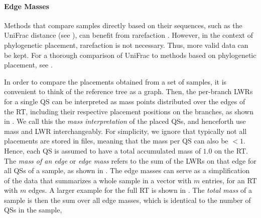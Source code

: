 \paragraph{Edge Masses}
\label{ch:Foundations:sec:PhylogeneticPlacement:sub:PlacementProcessing:par:EdgeMasses}

Methods that compare samples directly based on their sequences,
such as the UniFrac distance \cite{Lozupone2005,Lozupone2007a}
(see ),
can benefit from rarefaction \cite{Weiss2017}.
However, in the context of phylogenetic placement, rarefaction is not necessary.
Thus, more valid data can be kept.
For a thorough comparison of UniFrac to methods based on phylogenetic placement, see \cite{Matsen2011a}.

In order to compare the placements obtained from a set of samples,
it is convenient to think of the reference tree as a graph.
Then, the per-branch \acp{LWR} for a single \ac{QS}
can be interpreted as mass points distributed over the edges of the \ac{RT},
including their respective placement positions on the branches, as shown in .
We call this the \emph{mass interpretation} of the placed \acp{QS},
and henceforth use mass and \ac{LWR} interchangeably.
For simplicity, we ignore that typically not all placements are stored in  files,
meaning that the mass per QS can also be $<1$.
Hence, each \ac{QS} is assumed to have a total accumulated mass of $1.0$ on the \ac{RT}.
The \emph{mass of an edge} or \emph{edge mass} refers to the sum of the \acp{LWR} on that edge for all \acp{QS} of a sample,
as shown in .
The edge masses can serve as a simplification of the data
that summarizes a whole sample in a vector with $m$ entries, for an \ac{RT} with $m$ edges.
A larger example for the full \ac{RT} is shown in .
The \emph{total mass} of a sample is then the sum over all edge masses,
which is identical to the number of \acp{QS} in the sample,


